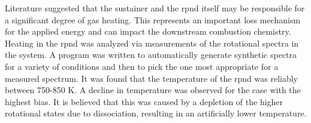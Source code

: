 Literature suggested that the sustainer and the \acs{rpnd} itself may be
responsible for a significant degree of gas heating. This represents an
important loss mechanism for the applied energy and can impact the downstream
combustion chemistry. Heating in the \acs{rpnd} was analyzed via measurements of
the rotational spectra in the system. A program was written to automatically
generate synthetic spectra for a variety of conditions and then to pick the one
most appropriate for a measured spectrum. It was found that the temperature of
the \acs{rpnd} was reliably between 750-850 K. A decline in temperature was
observed for the case with the highest bias. It is believed that this was caused
by a depletion of the higher rotational states due to dissociation, resulting in
an artificially lower temperature.
